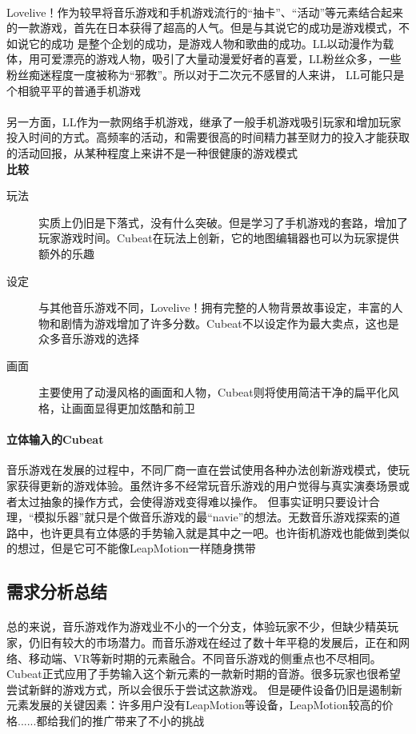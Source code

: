 \documentclass{article} \usepackage{CJK}
\begin{document}
\paragraph{}
Lovelive！作为较早将音乐游戏和手机游戏流行的“抽卡”、“活动”等元素结合起来的一款游戏，首先在日本获得了超高的人气。但是与其说它的成功是游戏模式，不如说它的成功
是整个企划的成功，是游戏人物和歌曲的成功。LL以动漫作为载体，用可爱漂亮的游戏人物，吸引了大量动漫爱好者的喜爱，LL粉丝众多，一些粉丝痴迷程度一度被称为“邪教”。所以对于二次元不感冒的人来讲，
LL可能只是个相貌平平的普通手机游戏
\paragraph{}
另一方面，LL作为一款网络手机游戏，继承了一般手机游戏吸引玩家和增加玩家投入时间的方式。高频率的活动，和需要很高的时间精力甚至财力的投入才能获取的活动回报，从某种程度上来讲不是一种很健康的游戏模式\\
\textbf{比较}
\begin{description}
  \item[玩法] 实质上仍旧是下落式，没有什么突破。但是学习了手机游戏的套路，增加了玩家游戏时间。Cubeat在玩法上创新，它的地图编辑器也可以为玩家提供额外的乐趣
  \item[设定] 与其他音乐游戏不同，Lovelive！拥有完整的人物背景故事设定，丰富的人物和剧情为游戏增加了许多分数。Cubeat不以设定作为最大卖点，这也是众多音乐游戏的选择
  \item[画面] 主要使用了动漫风格的画面和人物，Cubeat则将使用简洁干净的扁平化风格，让画面显得更加炫酷和前卫
\end{description}
\paragraph{立体输入的Cubeat}
音乐游戏在发展的过程中，不同厂商一直在尝试使用各种办法创新游戏模式，使玩家获得更新的游戏体验。虽然许多不经常玩音乐游戏的用户觉得与真实演奏场景或者太过抽象的操作方式，会使得游戏变得难以操作。
但事实证明只要设计合理，“模拟乐器”就只是个做音乐游戏的最“navie”的想法。无数音乐游戏探索的道路中，也许更具有立体感的手势输入就是其中之一吧。也许街机游戏也能做到类似的想过，但是它可不能像LeapMotion一样随身携带
\subsection{需求分析总结}
\paragraph{}
总的来说，音乐游戏作为游戏业不小的一个分支，体验玩家不少，但缺少精英玩家，仍旧有较大的市场潜力。而音乐游戏在经过了数十年平稳的发展后，正在和网络、移动端、VR等新时期的元素融合。不同音乐游戏的侧重点也不尽相同。
Cubeat正式应用了手势输入这个新元素的一款新时期的音游。很多玩家也很希望尝试新鲜的游戏方式，所以会很乐于尝试这款游戏。
但是硬件设备仍旧是遏制新元素发展的关键因素：许多用户没有LeapMotion等设备，LeapMotion较高的价格......都给我们的推广带来了不小的挑战
\end{document}
